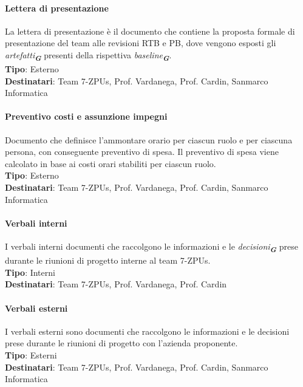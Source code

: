\documentclass[a4paper,12pt]{article}
\newcommand{\glossario}[1]{\textit{#1}\textsubscript{\textbf{\textit{\textcolor{lightblack}{G}}}}}
\begin{document}
\paragraph{Lettera di presentazione}\label{letteraDiPresentazione}
La lettera di presentazione è il documento che contiene la proposta formale di presentazione del team alle revisioni RTB e PB, dove vengono esposti gli \glossario{artefatti} presenti della rispettiva \glossario{baseline}. \\
\textbf{Tipo}: Esterno \\
\textbf{Destinatari}: Team 7-ZPUs, Prof. Vardanega, Prof. Cardin, Sanmarco Informatica \\

\paragraph{Preventivo costi e assunzione impegni}
Documento che definisce l'ammontare orario per ciascun ruolo e per ciascuna persona, con conseguente preventivo di spesa. Il preventivo di spesa viene calcolato in base ai costi orari stabiliti per ciascun ruolo. \\
\textbf{Tipo}: Esterno \\
\textbf{Destinatari}: Team 7-ZPUs, Prof. Vardanega, Prof. Cardin, Sanmarco Informatica \\

\paragraph{Verbali interni}
I verbali interni documenti che raccolgono le informazioni e le \glossario{decisioni} prese durante le riunioni di progetto interne al team 7-ZPUs. \\
\textbf{Tipo}: Interni \\
\textbf{Destinatari}: Team 7-ZPUs, Prof. Vardanega, Prof. Cardin \\

\paragraph{Verbali esterni}
I verbali esterni sono documenti che raccolgono le informazioni e le decisioni prese durante le riunioni di progetto con l'azienda proponente. \\
\textbf{Tipo}: Esterni \\
\textbf{Destinatari}: Team 7-ZPUs, Prof. Vardanega, Prof. Cardin, Sanmarco Informatica \\
\end{document}
